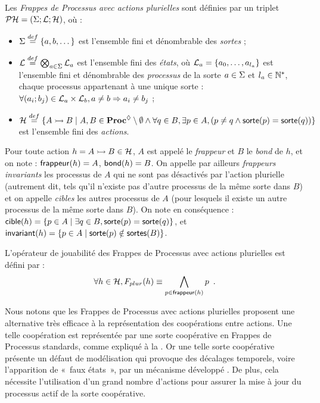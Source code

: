 \begin{definition}
  Les \emph{Frappes de Processus avec actions plurielles} sont définies
  par un triplet $\mathcal{PH} = (\Sigma; \mathcal{L}; \mathcal{H})$, où :
  \begin{itemize}
    \item $\Sigma \stackrel{def}= \{a, b, \dots\}$ est l'ensemble fini et dénombrable des \emph{sortes} ;
    \item $\mathcal{L} \stackrel{def}= \bigotimes_{a \in \Sigma} \mathcal{L}_a$ est l'ensemble fini des \emph{états},
      où $\mathcal{L}_a = \{a_0, \ldots, a_{l_a}\}$ est l'ensemble fini et dénombrable
      des \emph{processus} de la sorte $a \in \Sigma$ et $l_a \in \mathbb{N}^*$,
      chaque processus appartenant à une unique sorte :
      $\forall (a_i; b_j) \in \mathcal{L}_a \times \mathcal{L}_b, a \neq b \Rightarrow a_i \neq b_j$ ;
    \item $\mathcal{H} \stackrel{def}= \{\mbox{$A \rightarrowtail B$} \mid A, B \in \mathbf{Proc}^{\lozenge} \setminus \emptyset \wedge
      \forall q \in B, \exists p \in A, (p \neq q \wedge \mathsf{sorte}(p) = \mathsf{sorte}(q)) \}$
      est l'ensemble fini des \emph{actions}.
  \end{itemize}
\end{definition}
%
\noindent
Pour toute action $h = \mbox{$A \rightarrowtail B$} \in \mathcal{H}$,
$A$ est appelé le \emph{frappeur} et $B$ le \emph{bond} de $h$,
et on note : $\mathsf{frappeur}(h) = A$, $\mathsf{bond}(h) = B$.
On appelle par ailleurs \emph{frappeurs invariants} les processus de $A$
qui ne sont pas désactivés par l'action plurielle
(autrement dit, tels qu'il n'existe pas d'autre processus de la même sorte dans $B$)
et on appelle \emph{cibles} les autres processus de $A$
(pour lesquels il existe un autre processus de la même sorte dans $B$).
On note en conséquence :
$\mathsf{cible}(h) = \{ p \in A \mid \exists q \in B, \mathsf{sorte}(p) = \mathsf{sorte}(q) \}$,
et $\mathsf{invariant}(h) = \{ p \in A \mid \mathsf{sorte}(p) \notin \mathsf{sortes}(B) \}$.

\begin{definition}
  L'opérateur de jouabilité des Frappes de Processus avec actions plurielles est défini par :
  \[\forall h \in \mathcal{H}, F_{plur}(h) \equiv \bigwedge_{p \in \mathsf{frappeur}(h)} p \enspace.\]
\end{definition}

\myskip

Nous notons que les Frappes de Processus avec actions plurielles proposent une alternative
très efficace à la représentation des coopérations entre actions.
Une telle coopération est représentée par une sorte coopérative en Frappes de Processus
standards, comme expliqué à la .
Or une telle sorte coopérative présente un défaut de modélisation qui provoque des décalages
temporels, voire l'apparition de «~faux états~», par un mécanisme développé
.
De plus, cela nécessite l'utilisation d'un grand nombre d'actions pour assurer la mise à jour
du processus actif de la sorte coopérative.

